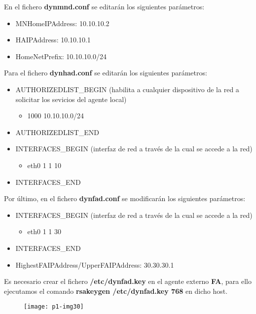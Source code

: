 \documentclass[10pt]{article}
\begin{document}
En el fichero \textbf{dynmnd.conf} se editarán los siguientes parámetros:

\begin{itemize}
		\item MNHomeIPAddress: 10.10.10.2
		\item HAIPAddress: 10.10.10.1
		\item HomeNetPrefix: 10.10.10.0/24
\end{itemize}

Para el fichero \textbf{dynhad.conf} se editarán los siguientes parámetros:

\begin{itemize}
		\item AUTHORIZEDLIST\_BEGIN (habilita a cualquier dispositivo de la red a solicitar los sevicios del agente local)
			\begin{itemize}
				\item 1000		10.10.10.0/24
			\end{itemize}
		\item AUTHORIZEDLIST\_END
		\item INTERFACES\_BEGIN (interfaz de red a través de la cual se accede a la red)
			\begin{itemize}			
				\item eth0 1 1 10
			\end{itemize}				
		\item INTERFACES\_END
\end{itemize}

Por último, en el fichero \textbf{dynfad.conf} se modificarán los siguientes parámetros: 

\begin{itemize}
		\item INTERFACES\_BEGIN (interfaz de red a través de la cual se accede a la red)
			\begin{itemize}			
				\item eth0 1 1 30
			\end{itemize}	
		\item INTERFACES\_END
		\item HighestFAIPAddress/UpperFAIPAddress: 30.30.30.1
\end{itemize}

Es necesario crear el fichero \textbf{/etc/dynfad.key} en el agente externo \textbf{FA}, para ello ejecutamos el comando \textbf{rsakeygen /etc/dynfad.key 768} en dicho host.

\begin{figure}[H]
	\begin{center}
 		\texttt{[image: p1-img30]}
	\end{center} 
\end{figure}
\end{document}
